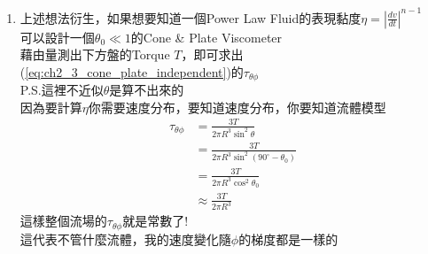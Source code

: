 \documentclass[../main.tex]{subfiles}
\begin{document}
\begin{itemize}
\begin{enumerate}
\begin{equation}
      T = \frac{4\pi}{3} \cdot \frac{\mu\omega R^3 \sin(\theta_1)}{g(\theta_1)}
    \end{equation}
    $\tau_{\theta\phi}$是:
    \begin{equation}
      \tau_{\theta\phi} = \frac{2\mu\omega\sin(\theta_1)}{g(\theta_1)}\frac{1}{\sin^2\theta}
    \end{equation}
    將兩者互除:
    \begin{align}
      \frac{\tau_{\theta\phi}}{T} &= \frac{\frac{2\mu\omega\sin(\theta_1)}{g(\theta_1)\sin^2\theta}}
      {\frac{4\pi}{3} \cdot \frac{\mu\omega R^3 \sin(\theta_1)}{g(\theta_1)}} \nonumber\\
      &= \frac{2\mu\omega\sin(\theta_1)g(\theta_1)}
      {g(\theta_1)\sin^2\theta\cdot \frac{4\pi}{3} \cdot \mu\omega R^3 \sin(\theta_1)} \nonumber\\
      &= \frac{3}{2\pi R^3 \sin^2\theta} \nonumber\\
      \Rightarrow\quad 
      \tau_{\theta\phi} &= \frac{3T}{2\pi R^3 \sin^2\theta} \label{eq:ch2_3_cone_plate_independent}
    \end{align}
    也就是說，假設我從量測數據獲得了一個$T$，那不管\\
    \\
    我都能知道任何位置所受到的$\tau_{\theta\phi}$
    \item 上述想法衍生，如果想要知道一個Power Law Fluid的表現黏度$\eta = \left|\frac{dv}{dt}\right|^{n-1}$\\
    可以設計一個$\theta_0\ll 1$的Cone \& Plate Viscometer\\
    藉由量測出下方盤的Torque $T$，即可求出(\ref{eq:ch2_3_cone_plate_independent})的$\tau_{\theta\phi}$\\
    P.S.這裡不近似$\theta$是算不出來的\\
    因為要計算$\eta$你需要速度分布，要知道速度分布，你要知道流體模型
    \begin{align}
        \tau_{\theta\phi} &= \frac{3T}{2\pi R^3 \sin^2\theta} \nonumber\\
        &= \frac{3T}{2\pi R^3  \sin^2(90^\circ -\theta_0)} \nonumber\\
        &= \frac{3T}{2\pi R^3  \cos^2\theta_0} \nonumber\\
        &\approx \boxed{\frac{3T}{2\pi R^3} }
    \end{align}
    這樣整個流場的$\tau_{\theta\phi}$就是常數了!\\
    這代表不管什麼流體，我的速度變化隨$\phi$的梯度都是一樣的\\

\end{enumerate}
\end{itemize}
\end{document}

